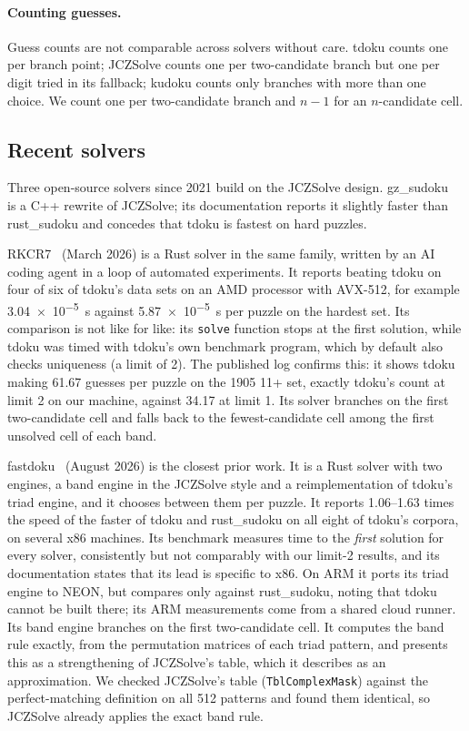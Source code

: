 \documentclass[11pt]{article}
\theoremstyle{definition}
\theoremstyle{plain}
\begin{document}
\paragraph{Counting guesses.} Guess counts are not comparable across solvers without care. tdoku counts one per branch
point; JCZSolve counts one per two-candidate branch but one per digit tried in its fallback; kudoku counts only
branches with more than one choice. We count one per two-candidate branch and $n-1$ for an $n$-candidate cell.

\subsection{Recent solvers}

Three open-source solvers since 2021 build on the JCZSolve design. gz\_sudoku~\cite{shines77_gzsudoku} is a C++ rewrite
of JCZSolve; its documentation reports it slightly faster than rust\_sudoku and concedes that tdoku is fastest on hard
puzzles.

RKCR7~\cite{rkcr7_2026autoresearch} (March 2026) is a Rust solver in the same family, written by an AI coding agent in
a loop of automated experiments. It reports beating tdoku on four of six of tdoku's data sets on an AMD processor with
AVX-512, for example \SI{3.04e-5}{\second} against \SI{5.87e-5}{\second} per puzzle on the hardest set. Its comparison is not like for like: its
\texttt{solve} function stops at the first solution, while tdoku was timed with tdoku's own benchmark program, which by
default also checks uniqueness (a limit of 2). The published log confirms this: it shows tdoku making 61.67 guesses per
puzzle on the 1905 11+ set, exactly tdoku's count at limit 2 on our machine, against 34.17 at limit 1. Its solver
branches on the first two-candidate cell and falls back to the fewest-candidate cell among the first unsolved cell of
each band.

fastdoku~\cite{rocketbombs2026fastdoku} (August 2026) is the closest prior work. It is a Rust solver with two
engines, a band engine in the JCZSolve style and a reimplementation of tdoku's triad engine, and it chooses between
them per puzzle. It reports 1.06--1.63 times the speed of the faster of tdoku and rust\_sudoku on all eight of tdoku's
corpora, on several x86 machines. Its benchmark measures time to the \emph{first} solution for every solver,
consistently but not comparably with our limit-2 results, and its documentation states that its lead is specific to
x86. On ARM it ports its triad engine to NEON, but compares only against rust\_sudoku, noting that tdoku cannot be
built there; its ARM measurements come from a shared cloud runner. Its band engine branches on the first
two-candidate cell. It computes the band rule exactly, from the permutation matrices of each triad pattern, and
presents this as a strengthening of JCZSolve's table, which it describes as an approximation. We checked JCZSolve's
table (\texttt{TblComplexMask}) against the perfect-matching definition on all 512 patterns and found them identical,
so JCZSolve already applies the exact band rule.
\end{document}
